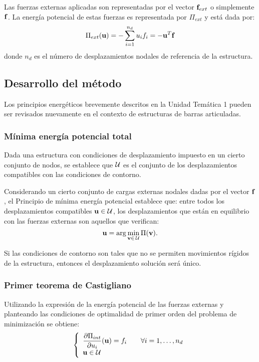 Las fuerzas externas aplicadas son representadas por el vector ${\bf f}_{ext}$ o simplemente ${\bf f}$. %
%
La energía potencial de estas fuerzas es representada por $\Pi_{ext}$ y está dada por:
%
\begin{equation}
 \Pi_{ext}({\bf u}) = - \sum_{i=1}^{n_d} u_i f_i = - {\bf u}^T {\bf f} 
\end{equation}
%
donde $n_d$ es el número de desplazamientos nodales de referencia de la estructura.



\subsection{Desarrollo del método}

Los principios energéticos brevemente descritos en la Unidad Temática 1 pueden ser revisados nuevamente en el contexto de estructuras de barras articuladas.


\subsubsection{Mínima energía potencial total}

Dada una estructura con condiciones de desplazamiento impuesto en un cierto conjunto de nodos, se establece que ${\mathcal U}$ es el conjunto de los desplazamientos compatibles con las condiciones de contorno. %
%


Considerando un cierto conjunto de cargas externas nodales dadas por el vector ${\bf f}$, el Principio de mínima energía potencial establece que: entre todos los desplazamientos compatibles ${\bf u} \in {\mathcal U}$, los desplazamientos que están en equilibrio con las fuerzas externas son aquellos que verifican:
%
\begin{equation}
{\bf u} = \arg\min_{{\bf v} \in \, {\mathcal U}} \Pi({\bf v}).
\end{equation}

Si las condiciones de contorno son tales que no se permiten movimientos rígidos de la estructura, entonces el desplazamiento solución será único.


\subsubsection{Primer teorema de Castigliano}

Utilizando la expresión de la energía potencial de las fuerzas externas y planteando las condiciones de optimalidad de primer orden del problema de minimización se obtiene:
%
\begin{equation}\label{eqn:castiguno}
\left\{ 
\begin{array}{l}
\displaystyle  \frac{\partial \Pi_{int} }{ \partial u_i}({\bf u}) = f_i \qquad \forall i=1,\dots, n_d\\
  {\bf u} \in {\mathcal U}
\end{array}
  \right.
\end{equation}

